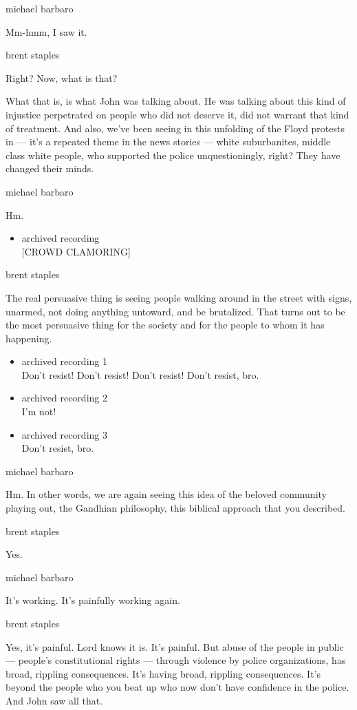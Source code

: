 michael barbaro

Mm-hmm, I saw it.

brent staples

Right? Now, what is that?

What that is, is what John was talking about. He was talking about this
kind of injustice perpetrated on people who did not deserve it, did not
warrant that kind of treatment. And also, we've been seeing in this
unfolding of the Floyd protests in --- it's a repeated theme in the news
stories --- white suburbanites, middle class white people, who supported
the police unquestioningly, right? They have changed their minds.

michael barbaro

Hm.

\begin{itemize}
\tightlist
\item
  archived recording\\
  {[}CROWD CLAMORING{]}
\end{itemize}

brent staples

The real persuasive thing is seeing people walking around in the street
with signs, unarmed, not doing anything untoward, and be brutalized.
That turns out to be the most persuasive thing for the society and for
the people to whom it has happening.

\begin{itemize}
\item
  archived recording 1\\
  Don't resist! Don't resist! Don't resist! Don't resist, bro.
\item
  archived recording 2\\
  I'm not!
\item
  archived recording 3\\
  Don't resist, bro.
\end{itemize}

michael barbaro

Hm. In other words, we are again seeing this idea of the beloved
community playing out, the Gandhian philosophy, this biblical approach
that you described.

brent staples

Yes.

michael barbaro

It's working. It's painfully working again.

brent staples

Yes, it's painful. Lord knows it is. It's painful. But abuse of the
people in public --- people's constitutional rights --- through violence
by police organizations, has broad, rippling consequences. It's having
broad, rippling consequences. It's beyond the people who you beat up who
now don't have confidence in the police. And John saw all that.

